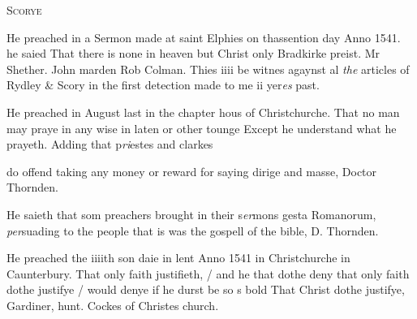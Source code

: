\documentclass[12pt, a4paper]{book}
\begin{document}
               
               	
				\begin{center}  {\scshape Scorye}  \end{center}
			


               	
               		
			
               		
		\ifthenelse{\isodd{\thepage}}
		{\reversemarginpar}
		{\normalmarginpar}
		He preached in a Sermon made at saint Elphies
 on thassention day Anno 1541. he saied
 That there is none in heaven but Christ only
               			Bradkirke preist. Mr Shether. John marden Rob Colman.
               			Thies iiii be witnes agaynst al \textit{the} articles of Rydley \& Scory
 in the first detection made to me ii yer\textit{es} past.
               	
               	
			
               		
				\marginpar[\vspace{0.5cm}{\textcolor{Gray}{n}}]{}
			
               		
		\ifthenelse{\isodd{\thepage}}
		{\reversemarginpar}
		{\normalmarginpar}
		He preached in August last in the chapter hous
 of Christchurche. That no man may praye
 in any wise in laten or other tounge Except he
 understand what he prayeth. Adding that p\textit{ri}estes and clarkes
			
 do offend taking any money or reward for saying
 dirige and masse, Doctor Thornden.
               	
				\marginpar[\vspace{0.5cm}{\textcolor{Gray}{sclaunderous}}]{}
			
		\ifthenelse{\isodd{\thepage}}
		{\reversemarginpar}
		{\normalmarginpar}
		He saieth that som preachers brought in their s\textit{er}mons
 gesta Romanorum, \textit{per}suading to the people that is
               		was the gospell of the bible, D. Thornden.

		\ifthenelse{\isodd{\thepage}}
		{\reversemarginpar}
		{\normalmarginpar}
		He preached the iiiith son
			daie in lent Anno 1541 in
	Christchurche in Caunterbury. That only faith
 justifieth, / and he that dothe deny that only faith
 dothe justifye / would denye if he durst be
 so s bold That Christ dothe justifye,
	Gardiner, hunt. Cockes of Christes church.
 
\end{document}
